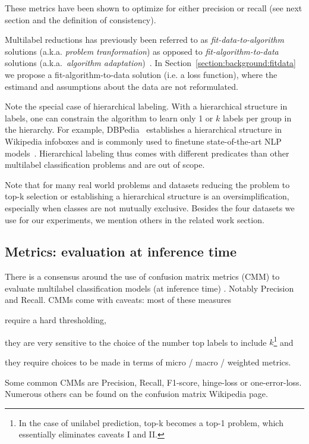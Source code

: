 These  metrics have been shown to optimize for either precision or recall (see next section and the definition of consistency).

Multilabel reductions has previously been referred to as \emph{fit-data-to-algorithm} solutions (a.k.a. \emph{problem tranformation}) as opposed to \emph{fit-algorithm-to-data} solutions (a.k.a.\ \emph{algorithm adaptation})~\cite{multilabelReview, multilabelReview2}. In Section~\ref{section:background:fitdata} we propose a fit-algorithm-to-data solution (i.e. a loss function), where the estimand and assumptions about the data are not reformulated.

 Note the special case of hierarchical labeling. With a hierarchical structure in labels, one can constrain the algorithm to learn only 1 or $k$ labels per group in the hierarchy. For example, DBPedia~\citep{lehmann2015dbpedia} establishes a hierarchical structure in Wikipedia infoboxes and is commonly used to finetune state-of-the-art NLP models~\citep[see, e.g.,][]{XLNet, ULMFit}. Hierarchical labeling thus comes with different predicates than other multilabel classification problems and are out of scope.

Note that for many real world problems and datasets reducing the problem to top-k selection or establishing a hierarchical structure is an oversimplification, especially when classes are not mutually exclusive. Besides the four datasets we use for our experiments, we mention others in the related work section.

\subsection{Metrics: evaluation at inference time}
\label{section:background:metrics}

There is a consensus around the use of confusion matrix metrics (CMM) to evaluate multilabel classification models (at inference time) . Notably Precision and Recall. CMMs come with caveats: most of these measures 
\begin{enumerate*}
\item require a hard thresholding, 
\item they are very sensitive to the choice of the number top labels to include $k$\footnote{In the case of unilabel prediction, top-k becomes a top-1 problem, which essentially eliminates caveats I and II.} and 
\item they require choices to be made in terms of  micro / macro / weighted metrics.
\end{enumerate*}
Some common CMMs are Precision, Recall, F1-score, hinge-loss or one-error-loss. Numerous others can be found on the confusion matrix Wikipedia page.

